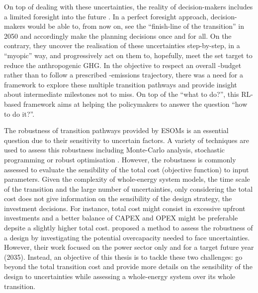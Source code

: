 On top of dealing with these uncertainties, the reality of decision-makers includes a limited foresight into the future \cite{poncelet2016myopic}. In a perfect foresight approach, decision-makers would be able to, from now on, see the ``finish-line of the transition'' in 2050 and accordingly make the planning decisions once and for all. On the contrary, they uncover the realisation of these uncertainties step-by-step, in a ``myopic'' way, and progressively act on them to, hopefully, meet the set target to reduce the anthropogenic \gls{GHG}. In the objective to respect an overall -budget rather than to follow a prescribed -emissions trajectory, there was a need for a framework to explore these multiple transition pathways and provide insight about intermediate milestones not to miss. On top of the ``what to do?'', this \gls{RL}-based framework aims at helping the policymakers to answer the  question ``how to do it?''.

The robustness of transition pathways provided by ESOMs is an essential question due to their sensitivity to uncertain factors. A variety of techniques are used to assess this robustness including Monte-Carlo analysis, stochastic programming or robust optimisation \cite{yue2018review}. However, the robustness is commonly assessed to evaluate the sensibility of the total cost (objective function) to input parameters.  Given the complexity of whole-energy system models, the time scale of the transition and the large number of uncertainties, only considering the total cost does not give information on the sensibility of the design strategy, \ie the investment decisions. For instance, total cost might consist in excessive upfront investments and a better balance of \gls{CAPEX} and \gls{OPEX} might be preferable depsite a slightly higher total cost. \citet{moret2020overcapacity} proposed a method to assess the robustness of a design by investigating the potential overcapacity needed to face uncertainties. However, their work focused on the power sector only and for a target future year (2035).  Instead, an objective of this thesis is to tackle these two challenges: go beyond the total transition cost and provide more details on the sensibility of the design to uncertainties while assessing a whole-energy system over its whole transition.\\

